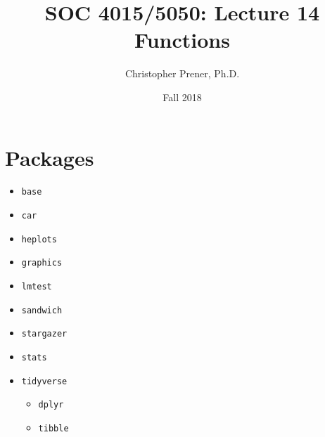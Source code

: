 \documentclass{tufte-handout}
\title{SOC 4015/5050: Lecture 14 Functions}
\author{Christopher Prener, Ph.D.}
\date{Fall 2018}
\begin{document}
\maketitle %

\vspace{5mm}
\section{Packages}
\begin{itemize}
\item \texttt{base}
\item \texttt{car}
\item \texttt{heplots}
\item \texttt{graphics}
\item \texttt{lmtest}
\item \texttt{sandwich}
\item \texttt{stargazer}
\item \texttt{stats}
\item \texttt{tidyverse}
\begin{itemize}
\item \texttt{dplyr}
\item \texttt{tibble}
\end{itemize}
\end{itemize}

\vspace{5mm}
\end{document}
